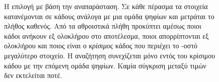 \begin{figure}[H]
    \caption[Επιλογή με βάση την αναπαράσταση]{Η επιλογή με βάση την αναπαράσταση. Σε κάθε πέρασμα τα στοιχεία
    κατανέμονται σε κάδους ανάλογα με μια ομάδα ψηφίων και μετράται το πλήθος
    καθενός. Από τα αθροιστικά πλήθη προκύπτει αμέσως ποιοι κάδοι ανήκουν εξ
    ολοκλήρου στο αποτέλεσμα, ποιοι απορρίπτονται εξ ολοκλήρου και ποιος είναι ο
    \emph{κρίσιμος} κάδος που περιέχει το -οστό μεγαλύτερο στοιχείο. Η
    αναζήτηση συνεχίζεται μόνο εντός του κρίσιμου κάδου με την επόμενη ομάδα
    ψηφίων. Καμία σύγκριση μεταξύ τιμών δεν εκτελείται ποτέ.}
    \label{fig:bg-radix}
\end{figure}
